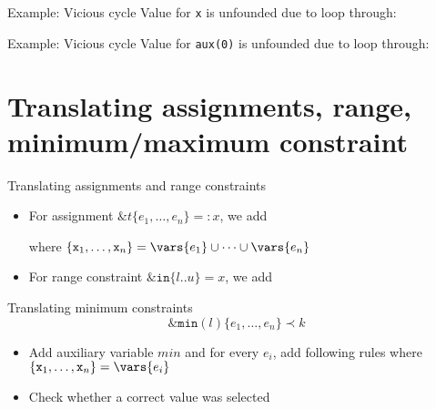 \documentclass[11pt]{beamer}
\begin{document}
\begin{frame}{Example: Vicious cycle}
  Value for \texttt{x} is unfounded due to loop through:
  \scriptsize
\end{frame}

\begin{frame}{Example: Vicious cycle}
  Value for \texttt{aux(0)} is unfounded due to loop through:
  \small
\end{frame}

\section{Translating assignments, range, minimum/maximum constraint}
\begin{frame}{Translating assignments and range constraints}
 \begin{itemize}
    \item For assignment $\mathtt{\&}t\mathtt{\{}e_1,\dots,e_n\mathtt{\}} =: x$, we add
    \pause
    
    where $\{\mathtt{x}_1,\dots,\mathtt{x}_n\}=\vars{e_1}\cup\dots\cup\vars{e_n}$
    \pause
    \item For range constraint $\mathtt{\&in}\mathtt{\{}l\mathtt{..}u{\}} = x$, we add
    \pause
    
 \end{itemize}
\end{frame}

\begin{frame}{Translating minimum constraints}
\[\mathtt{\&min}(l)\mathtt{\{}e_1,\dots,e_n\mathtt{\}} \prec k\]
\pause
 \begin{itemize}
    \item Add auxiliary variable $\mathit{min}$ and for every $e_i$, add following rules where $\{\mathtt{x}_1,\dots,\mathtt{x}_n\}=\vars{e_i}$
    
    \pause
    \item Check whether a correct value was selected
    
   \end{itemize}
\end{frame}
\end{document}
